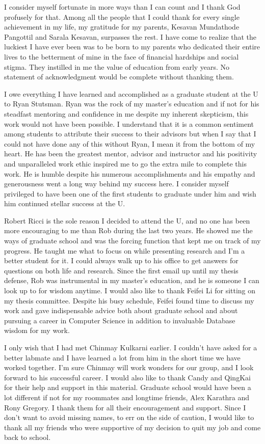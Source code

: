 I consider myself fortunate in more ways than I can count and I thank God profusely for that. Among all the people that I could thank for every single achievement in my life, my gratitude for my parents, Kesavan Mundathode Pangottil
and Sarala Kesavan, surpasses the rest. I have come to realize that the luckiest I have ever been was to be born to my parents who dedicated their entire lives to the betterment of mine in the face of financial hardships and social stigma. They instilled in me the value of education from early years. No statement of acknowledgment would be complete without thanking them.

I owe everything I have learned and accomplished as a graduate student at the U to Ryan Stutsman. Ryan was the rock of my master's education and if not for his steadfast mentoring and confidence in me despite my inherent skepticism, this work would not have been possible.
I understand that it is a common sentiment among students to attribute their success to their advisors but when I say that I could not have done any of this without Ryan, I mean it from the bottom of my heart. He has been the greatest mentor, advisor and instructor and his positivity and unparalleled work ethic inspired me to go the extra mile to complete this work.
He is humble despite his numerous accomplishments and his empathy and generousness went a long way behind my success here. I consider myself privileged to have been one of the first students to graduate under him and wish him continued stellar success at the U.

Robert Ricci is the sole reason I decided to attend the U, and no one has been more encouraging to me than Rob during the last two years. He showed me the ways of graduate school and
was the forcing function that kept me on track of my progress. He taught me what to focus on while presenting research and I'm a better student for it. I could always walk up to his office to get answers for questions on both life and research. Since the first email up until my thesis defense, Rob was instrumental in my master's education, and he is someone I can look up to for wisdom anytime.
I would also like to thank Feifei Li for sitting on my thesis committee. Despite his busy schedule, Feifei found time to discuss my work and gave indispensable advice both about graduate school and about pursuing a career in Computer Science in addition to invaluable Database wisdom for my work.

I only wish that I had met Chinmay Kulkarni earlier. I couldn't have asked for a better labmate and I have learned a lot from him in the short time we have worked together.
I'm sure Chinmay will work wonders for our group, and I look forward to his successful career. I would also like to thank Candy and QingKai for their help and support in this material.
Graduate school would have been a lot different if not for my roommates and longtime friends, Alex Karathra and Rony Gregory. I thank them for all their encouragement and support.
Since I don't want to avoid missing names, to err on the side of caution, I would like to thank all my friends who were supportive of my decision to quit my job and come back to school.

